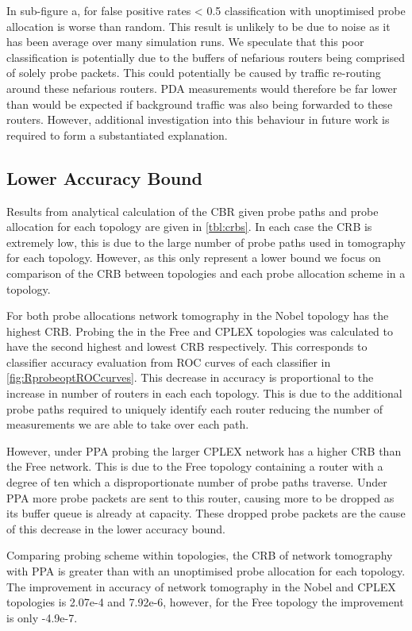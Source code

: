 In sub-figure a, for false positive rates < 0.5 classification with unoptimised probe allocation is worse than random. This result is unlikely to be due to noise as it has been average over many simulation runs. We speculate that this poor classification is potentially due to the buffers of nefarious routers being comprised of solely probe packets. This could potentially be caused by traffic re-routing around these nefarious routers. PDA measurements would therefore be far lower than would be expected if background traffic was also being forwarded to these routers. However, additional investigation into this behaviour in future work is required to form a substantiated explanation.

\subsection{Lower Accuracy Bound}
\label{ssec:Rloweraccuracybounds}
Results from analytical calculation of the CBR given probe paths and probe allocation for each topology are given in \cref{tbl:crbs}. In each case the CRB is extremely low, this is due to the large number of probe paths used in tomography for each topology. However, as this only represent a lower bound we focus on comparison of the CRB between topologies and each probe allocation scheme in a topology.\par
For both probe allocations network tomography in the Nobel topology has the highest CRB. Probing the in the Free and CPLEX topologies was calculated to have the second highest and lowest CRB respectively. This corresponds to classifier accuracy evaluation from ROC curves of each classifier in \cref{fig:RprobeoptROCcurves}. This decrease in accuracy is proportional to the increase in number of routers in each each topology. This is due to the additional probe paths required to uniquely identify each router reducing the number of measurements we are able to take over each path.\par
However, under PPA probing the larger CPLEX network has a higher CRB than the Free network. This is due to the Free topology containing a router with a degree of ten which a disproportionate number of probe paths traverse. Under PPA more probe packets are sent to this router, causing more to be dropped as its buffer queue is already at capacity. These dropped probe packets are the cause of this decrease in the lower accuracy bound.\par
Comparing probing scheme within topologies, the CRB of network tomography with PPA is greater than with an unoptimised probe allocation for each topology. The improvement in accuracy of network tomography in the Nobel and CPLEX topologies is 2.07e-4 and 7.92e-6, however, for the Free topology the improvement is only -4.9e-7.\par
